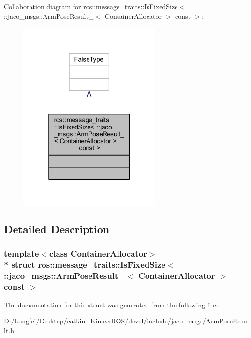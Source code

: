 Collaboration diagram for ros\+:\+:message\+\_\+traits\+:\+:Is\+Fixed\+Size$<$ \+:\+:jaco\+\_\+msgs\+:\+:Arm\+Pose\+Result\+\_\+$<$ Container\+Allocator $>$ const $>$\+:
\nopagebreak
\begin{figure}[H]
\begin{center}
\leavevmode
\includegraphics[width=205pt]{dd/d17/structros_1_1message__traits_1_1IsFixedSize_3_01_1_1jaco__msgs_1_1ArmPoseResult___3_01ContainerAa91ef6c681a2aa3ff397422491f2de18}
\end{center}
\end{figure}


\subsection{Detailed Description}
\subsubsection*{template$<$class Container\+Allocator$>$\\*
struct ros\+::message\+\_\+traits\+::\+Is\+Fixed\+Size$<$ \+::jaco\+\_\+msgs\+::\+Arm\+Pose\+Result\+\_\+$<$ Container\+Allocator $>$ const  $>$}



The documentation for this struct was generated from the following file\+:\begin{DoxyCompactItemize}
\item 
D\+:/\+Longfei/\+Desktop/catkin\+\_\+\+Kinova\+R\+O\+S/devel/include/jaco\+\_\+msgs/\hyperlink{ArmPoseResult_8h}{Arm\+Pose\+Result.\+h}\end{DoxyCompactItemize}
